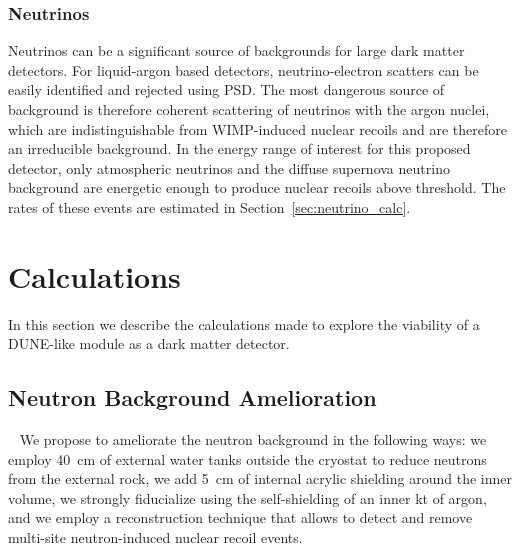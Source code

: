 \documentclass[a4paper,11pt]{article}
\newcommand{\rs}[1]{{\tt \color{purple}#1}}
\begin{document}
\subsubsection{Neutrinos}
Neutrinos can be a significant source of backgrounds for large dark matter detectors. For liquid-argon based detectors, neutrino-electron scatters can be easily identified and rejected using PSD. The most dangerous source of background is therefore coherent scattering of neutrinos with the argon nuclei, which are indistinguishable from WIMP-induced nuclear recoils and are therefore an irreducible background. In the energy range of interest for this proposed detector, only atmospheric neutrinos and the diffuse supernova neutrino background are energetic enough to produce nuclear recoils above threshold. The rates of these events are estimated in Section~\ref{sec:neutrino_calc}.

\section{Calculations}

In this section we describe the calculations made to explore the viability of a DUNE-like module as a dark matter detector.

\subsection{Neutron Background Amelioration}~\label{sec:nba}
We propose to ameliorate the neutron background in the following ways: we employ 40~cm of external water tanks outside the cryostat to reduce neutrons from the external rock, we add 5~cm of internal acrylic shielding around the inner volume, we strongly fiducialize using the  self-shielding of an inner kt of argon, and we employ a reconstruction technique that allows to detect and remove multi-site neutron-induced nuclear recoil events. 

\end{document}
